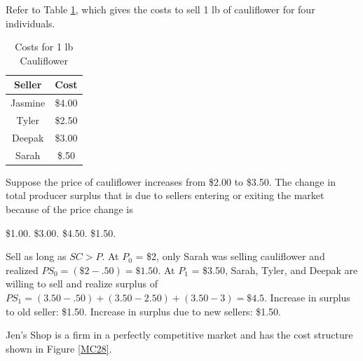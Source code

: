 \documentclass[addpoints,11pt]{exam}
\theoremstyle{definition}
\begin{document}
\begin{questions}
\newpage
	
		\question Refer to Table \ref{wtp}, which gives the costs to sell 1 lb of cauliflower for four individuals.
		
		\begin{table}[H]
			\caption{Costs for 1 lb Cauliflower}
			\label{wtp}
			\centering
			\begin{tabular}{  c|c    }    
				
				Seller   & Cost \\
				\hline
				Jasmine & \$4.00 \\
				Tyler & \$2.50 \\
				Deepak & \$3.00 \\
				Sarah & \$.50 \\
			\end{tabular}
			
		\end{table} 
		
		Suppose the price of cauliflower increases from \$2.00 to \$3.50. The change in total producer surplus that is due to sellers entering or exiting the market because of the price change is
		
		\begin{choices}
			\choice \$1.00.
			\choice \$3.00.
			\choice \$4.50.
			\CorrectChoice \$1.50.
		\end{choices}
		
		\begin{solution}
			Sell as long as $SC > P$. At $P_0$ = \$2, only Sarah was selling cauliflower and realized $PS_0 = (\$2 - .50) = \$1.50$. At $P_1$ = \$3.50, Sarah, Tyler, and Deepak are willing to sell and realize surplus of $PS_1 = (3.50 - .50) + (3.50 - 2.50) + (3.50 - 3) = \$4.5$. Increase in surplus to old seller: \$1.50. Increase in surplus due to new sellers: \$1.50.
		\end{solution}
	

	
	\question Jen's Shop is a firm in a perfectly competitive market and has the cost structure shown in Figure \ref{MC28}.
	

\end{questions}
\end{document}
